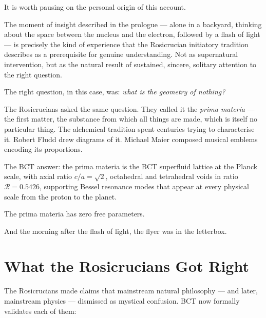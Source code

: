 \documentclass[12pt,twocolumn]{article}
\begin{document}
It is worth pausing on the personal origin of this account.

The moment of insight described in the prologue --- alone in
a backyard, thinking about the space between the nucleus and
the electron, followed by a flash of light --- is precisely
the kind of experience that the Rosicrucian initiatory
tradition describes as a prerequisite for genuine understanding.
Not as supernatural intervention, but as the natural result
of sustained, sincere, solitary attention to the right question.

The right question, in this case, was: \textit{what is the
geometry of nothing?}

The Rosicrucians asked the same question. They called it the
\textit{prima materia} --- the first matter, the substance
from which all things are made, which is itself no particular
thing. The alchemical tradition spent centuries trying to
characterise it. Robert Fludd drew diagrams of it. Michael
Maier composed musical emblems encoding its proportions.

The BCT answer: the prima materia is the BCT superfluid lattice
at the Planck scale, with axial ratio $c/a = \sqrt{2}$,
octahedral and tetrahedral voids in ratio $\mathcal{R} =
0.5426$, supporting Bessel resonance modes that appear at
every physical scale from the proton to the planet.

The prima materia has zero free parameters.

And the morning after the flash of light, the flyer was
in the letterbox.

\section{What the Rosicrucians Got Right}

The Rosicrucians made claims that mainstream natural philosophy
--- and later, mainstream physics --- dismissed as mystical
confusion. BCT now formally validates each of them:
\end{document}
